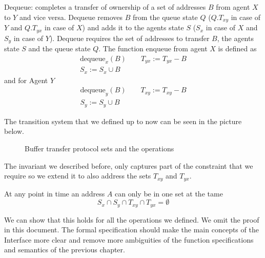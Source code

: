 \documentclass[a4paper,11pt,twoside]{report}
\begin{document}
	\begin{op}[Dequeue]
		Dequeue: completes a transfer of ownership of a set of addresses $B$ from agent $X$ to $Y$ 
		and vice versa. Dequeue removes $B$ from the queue state $Q$ ($Q.T_{xy}$ in case of $Y$ 
		and $Q.T_{yx}$ in case of $X$) and adds it to the agents state $S$ ($S_x$ in case of $X$ and 
		$S_y$ in case of $Y$). Dequeue requires the set of addresses to transfer $B$, the agents state 
		$S$ and the queue state $Q$. The function enqueue from agent $X$ is defined as
		\begin{align*} \text{dequeue}_{x}(B) \quad \quad T_{yx} := T_{yx} - B \\
		S_x := S_x \cup B  
		\end{align*}
		and for Agent $Y$
		\begin{align*} \text{dequeue}_{y}(B) \quad \quad T_{xy} := T_{xy} - B \\
		S_y := S_y \cup B  
		\end{align*}
	\end{op}
	
	The transition system that we defined up to now can be seen in the picture below. 
	
	\begin{figure}[!h]
		\begin{center}
			\caption{Buffer transfer protocol sets and the operations}
			\centerline{}
			\end{center}
	\end{figure}
		
	The invariant we described before, only captures part of the constraint that we require so we extend it to
	also address the sets $T_{xy}$ and $T_{yx}$.
	
	\begin{inv}
		At any point in time an address $A$ can only be in one set at the tame
		\[ S_x \cap S_y \cap T_{xy} \cap T_{yx} = \emptyset \]
	\end{inv}	

	We can show that this holds for all the operations we defined. We omit the proof in this document.
	The formal specification should make the main concepts of the \devif Interface more clear and 
	remove more ambiguities of the function specifications and semantics of the previous chapter. 



	
	
\end{document}
